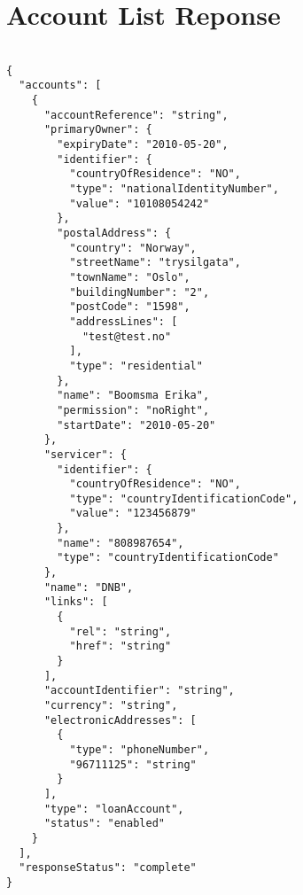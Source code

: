 \documentclass[12pt]{report}
\begin{document}
\section{Account List Reponse}
\begin{verbatim}

{
  "accounts": [
    {
      "accountReference": "string",
      "primaryOwner": {
        "expiryDate": "2010-05-20",
        "identifier": {
          "countryOfResidence": "NO",
          "type": "nationalIdentityNumber",
          "value": "10108054242"
        },
        "postalAddress": {
          "country": "Norway",
          "streetName": "trysilgata",
          "townName": "Oslo",
          "buildingNumber": "2",
          "postCode": "1598",
          "addressLines": [
            "test@test.no"
          ],
          "type": "residential"
        },
        "name": "Boomsma Erika",
        "permission": "noRight",
        "startDate": "2010-05-20"
      },
      "servicer": {
        "identifier": {
          "countryOfResidence": "NO",
          "type": "countryIdentificationCode",
          "value": "123456879"
        },
        "name": "808987654",
        "type": "countryIdentificationCode"
      },
      "name": "DNB",
      "links": [
        {
          "rel": "string",
          "href": "string"
        }
      ],
      "accountIdentifier": "string",
      "currency": "string",
      "electronicAddresses": [
        {
          "type": "phoneNumber",
          "96711125": "string"
        }
      ],
      "type": "loanAccount",
      "status": "enabled"
    }
  ],
  "responseStatus": "complete"
}
\end{verbatim}
\end{document}
